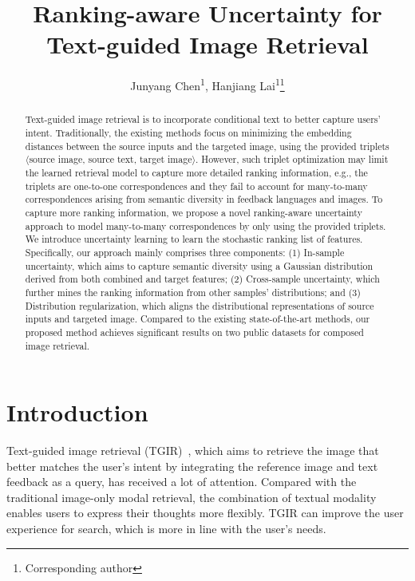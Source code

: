 \documentclass[letterpaper]{article} \usepackage{aaai24}  \usepackage{times}  \usepackage{helvet}  \usepackage{courier}  \usepackage[hyphens]{url}  \usepackage{graphicx} \urlstyle{rm} \def\UrlFont{\rm}  \usepackage{natbib}  \usepackage{caption} \frenchspacing  \setlength{\pdfpagewidth}{8.5in} \setlength{\pdfpageheight}{11in} \usepackage{amsmath,amsfonts}
\title{Ranking-aware Uncertainty for Text-guided Image Retrieval}
\author {
Junyang Chen\textsuperscript{\rm 1},
    Hanjiang Lai\textsuperscript{\rm 1}\thanks{Corresponding author}
}
\begin{document}
\maketitle

\begin{abstract}
Text-guided image retrieval is to incorporate conditional text to better capture users' intent. Traditionally, the existing methods focus on minimizing the embedding distances between the source inputs and the targeted image, using the provided triplets $\langle$source image, source text, target image$\rangle$. However, such triplet optimization may limit  the learned retrieval model to capture more detailed ranking information, e.g., the triplets are one-to-one correspondences and they fail to account for many-to-many correspondences arising from semantic diversity in feedback languages and images. To capture more ranking information, we propose a novel ranking-aware uncertainty approach to model many-to-many correspondences by only using the provided triplets. We introduce uncertainty learning to learn the stochastic ranking list of features. Specifically, our approach mainly comprises three components: (1) In-sample uncertainty, which aims to capture semantic diversity using a Gaussian distribution derived from both combined and target features; (2) Cross-sample uncertainty, which further mines the ranking information from other samples' distributions; and (3) Distribution regularization, which aligns the distributional representations of  source inputs and targeted image. Compared to the existing state-of-the-art methods, our proposed method achieves significant results on two public datasets for composed image retrieval.
\end{abstract}

\section{Introduction}

Text-guided image retrieval (TGIR)~\cite{vo2019TGIR}, which aims to retrieve the image that better matches the user's intent by integrating the reference image and text feedback as a query, has received a lot of attention. Compared with the traditional image-only modal retrieval, the combination of textual modality enables users to express their thoughts more flexibly. TGIR can improve the user experience for search, which is more in line with the user's needs.  
\end{document}
